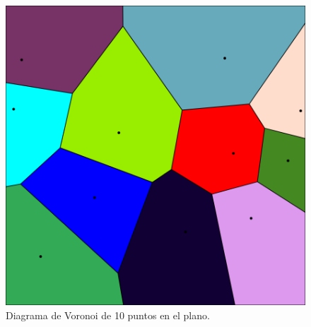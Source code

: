 \documentclass{beamer}
\DeclareMathOperator{\Del}{Del}
\begin{document}
\begin{frame}
\begin{columns}
\begin{figure}[H]
\begin{overprint}
      \centering\includegraphics[width=\textwidth]{slidesRes/voronoi10.png}
      \caption{Diagrama de Voronoi de 10 puntos en el plano.}
    \end{overprint}
  \end{figure}
\end{columns}
\end{frame}

\end{document}
